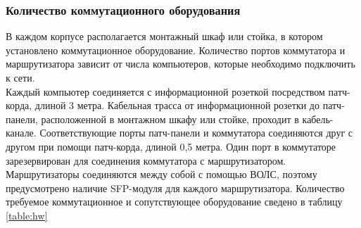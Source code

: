 \subsubsection{Количество коммутационного оборудования}
В каждом корпусе располагается монтажный шкаф или стойка, в котором установлено коммутационное оборудование.
Количество портов коммутатора и маршрутизатора зависит от числа компьютеров, которые необходимо подключить к сети.\\
Каждый компьютер соединяется с информационной розеткой посредством патч-корда, длиной 3 метра. Кабельная трасса от информационной розетки до патч-панели, расположенной в монтажном шкафу или стойке, проходит в кабель-канале. Соответствующие порты патч-панели и коммутатора соединяются друг с другом при помощи патч-корда, длиной 0,5 метра. Один порт в коммутаторе зарезервирован для соединения коммутатора с маршрутизатором. Маршрутизаторы соединяются между собой с помощью ВОЛС, поэтому предусмотрено наличие SFP-модуля для каждого маршрутизатора. Количество требуемое коммутационное и сопутствующее оборудование сведено в таблицу \ref{table:hw}

